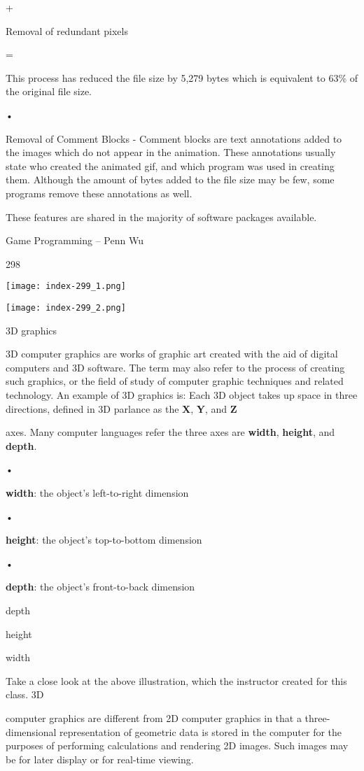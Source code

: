 \documentclass[
]{article}
\begin{document}
+

Removal of redundant pixels

=

This process has reduced the file size by 5,279 bytes which is
equivalent to 63\% of the original file size.

•

Removal of Comment Blocks - Comment blocks are text annotations added to
the images which do not appear in the animation. These annotations
usually state who created the animated gif, and which program was used
in creating them. Although the amount of bytes added to the file size
may be few, some programs remove these annotations as well.

These features are shared in the majority of software packages
available.

Game Programming -- Penn Wu

298

\protect\hypertarget{index_split_015.htmlux5cux23p299}{}{}\texttt{[image: index-299\_1.png]}

\texttt{[image: index-299\_2.png]}

3D graphics

3D computer graphics are works of graphic art created with the aid of
digital computers and 3D software. The term may also refer to the
process of creating such graphics, or the field of study of computer
graphic techniques and related technology. An example of 3D graphics is:
Each 3D object takes up space in three directions, defined in 3D
parlance as the \textbf{X}, \textbf{Y}, and \textbf{Z}

axes. Many computer languages refer the three axes are \textbf{width},
\textbf{height}, and \textbf{depth}.

•

\textbf{width}: the object's left-to-right dimension

•

\textbf{height}: the object's top-to-bottom dimension

•

\textbf{depth}: the object's front-to-back dimension

depth

height

width

Take a close look at the above illustration, which the instructor
created for this class. 3D

computer graphics are different from 2D computer graphics in that a
three-dimensional representation of geometric data is stored in the
computer for the purposes of performing calculations and rendering 2D
images. Such images may be for later display or for real-time viewing.
\end{document}

